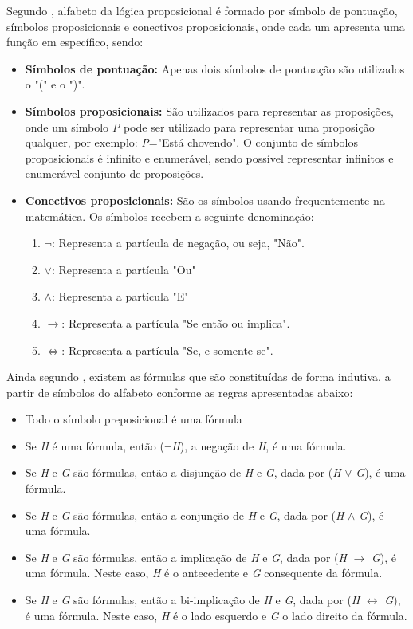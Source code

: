 Segundo \citeauthor{souza2017logica}, alfabeto da lógica proposicional é formado por símbolo de pontuação, símbolos proposicionais e conectivos proposicionais, onde cada um apresenta uma função em específico, sendo:
\begin{itemize}
  \item \textbf{Símbolos de pontuação: }Apenas dois símbolos de pontuação são utilizados o "(" e o ")".
  \item \textbf{Símbolos proposicionais:} São utilizados para representar as proposições, onde um símbolo \textit{P} pode ser utilizado para representar uma proposição qualquer, por exemplo: \textit{P}="Está chovendo". O conjunto de símbolos proposicionais é infinito e enumerável, sendo possível representar infinitos e enumerável conjunto de proposições.
  \item \textbf{Conectivos proposicionais:} São os símbolos usando frequentemente na matemática. Os símbolos recebem a seguinte denominação: 
\begin{enumerate}
\item \textbf{$\neg$}: Representa a partícula de negação, ou seja, "Não".
\item \textbf{$\lor$}: Representa a partícula "Ou"
\item \textbf{$\land$}: Representa a partícula "E"
\item \textbf{$\rightarrow$}: Representa a partícula "Se então ou implica".
\item \textbf{$\Leftrightarrow$}: Representa a partícula "Se, e somente se".
\end{enumerate} 
\end{itemize}

Ainda segundo \citeauthor{souza2017logica}, existem as fórmulas que são constituídas de forma indutiva, a partir de símbolos do alfabeto conforme as regras apresentadas abaixo:
\begin{itemize}
\item Todo o símbolo preposicional é uma fórmula
\item Se \textit{H} é uma fórmula, então ($\neg$\textit{H}), a negação de \textit{H}, é uma fórmula.
\item Se \textit{H} e \textit{G} são fórmulas, então a disjunção de \textit{H} e \textit{G}, dada por (\textit{H} $\lor$ \textit{G}), é uma fórmula.
\item Se \textit{H} e \textit{G} são fórmulas, então a conjunção de \textit{H} e \textit{G}, dada por (\textit{H} $\land$ \textit{G}), é uma fórmula.
\item Se \textit{H} e \textit{G} são fórmulas, então a implicação de \textit{H} e \textit{G}, dada por (\textit{H} $\rightarrow$ \textit{G}), é uma fórmula. Neste caso, \textit{H} é o antecedente e \textit{G} consequente da fórmula.
\item Se \textit{H} e \textit{G} são fórmulas, então a bi-implicação de \textit{H} e \textit{G}, dada por (\textit{H} $\leftrightarrow$ \textit{G}), é uma fórmula. Neste caso, \textit{H} é o lado esquerdo e \textit{G} o lado direito da fórmula.
\end{itemize}


